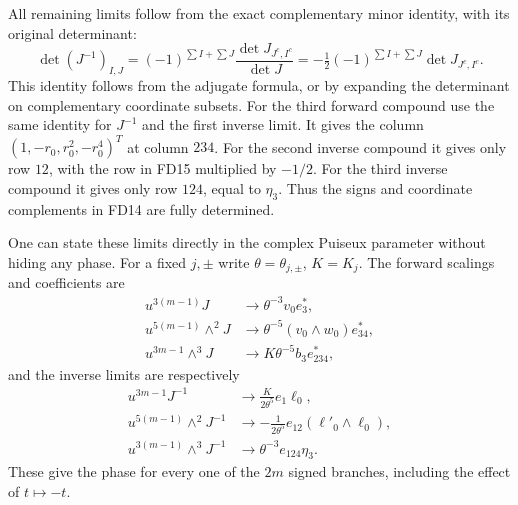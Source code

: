 \documentclass[11pt]{article}
\begin{document}
All remaining limits follow from the exact complementary
minor identity, with its original determinant:
\[
 \det(J^{-1})_{I,J}
 =(-1)^{\sum I+\sum J}\frac{\det J_{J^c,I^c}}{\det J}
 =-\tfrac12(-1)^{\sum I+\sum J}\det J_{J^c,I^c}.
 \tag{FD17}
\]
This identity follows from the adjugate formula, or by
expanding the determinant on complementary coordinate
subsets. For the third forward compound use the same
identity for \(J^{-1}\) and the first inverse limit.
It gives the column \((1,-r_0,r_0^2,-r_0^4)^T\)
at column \(234\). For the second inverse compound
it gives only row \(12\), with the row in FD15 multiplied
by \(-1/2\). For the third inverse compound it gives
only row \(124\), equal to \(\eta_3\). Thus the signs
and coordinate complements in FD14 are fully determined.

One can state these limits directly in the complex Puiseux
parameter without hiding any phase. For a fixed \(j,\pm\)
write \(\theta=\theta_{j,\pm}\), \(K=K_j\). The forward
scalings and coefficients are
\[
\begin{aligned}
 u^{3(m-1)}J&\longrightarrow\theta^{-3}v_0e_3^*,\\
 u^{5(m-1)}\wedge^2J&\longrightarrow
                     \theta^{-5}(v_0\wedge w_0)e_{34}^*,\\
 u^{3m-1}\wedge^3J&\longrightarrow K\theta^{-5}b_3e_{234}^*,
\end{aligned}\tag{FD18}
\]
and the inverse limits are respectively
\[
\begin{aligned}
 u^{3m-1}J^{-1}&\longrightarrow
                         \frac{K}{2\theta^5}e_1\ell_0,\\
 u^{5(m-1)}\wedge^2J^{-1}&\longrightarrow
                         -\frac1{2\theta^5}e_{12}
                                      (\ell'_0\wedge\ell_0),\\
 u^{3(m-1)}\wedge^3J^{-1}&\longrightarrow
                         \theta^{-3}e_{124}\eta_3.
\end{aligned}\tag{FD19}
\]
These give the phase for every one of the \(2m\) signed
branches, including the effect of \(t\mapsto-t\).
\end{document}
